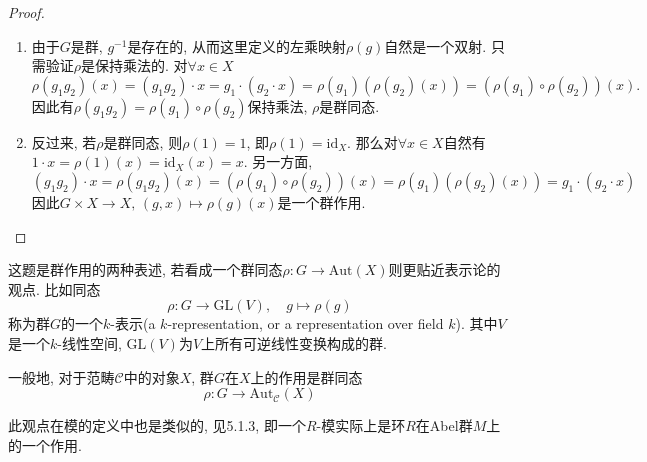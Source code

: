 \documentclass{../solutions-cn}
\begin{document}
\begin{proof}
    \begin{enumerate}[(1)]
        \item 由于$G$是群, $g^{-1}$是存在的, 从而这里定义的左乘映射$\rho(g)$自然是一个双射. 只需验证$\rho$是保持乘法的. 对$\forall x \in X$
        \[
            \rho(g_1g_2)(x) = (g_1g_2) \cdot x = g_1 \cdot (g_2 \cdot x) = \rho(g_1)(\rho(g_2)(x)) = (\rho(g_1) \circ \rho(g_2))(x).
        \]
        因此有$\rho(g_1g_2) = \rho(g_1) \circ \rho(g_2)$保持乘法, $\rho$是群同态.
        \item 反过来, 若$\rho$是群同态, 则$\rho(1) = 1$, 即$\rho(1) = \mathrm{id}_X$. 那么对$\forall x \in X$自然有$1 \cdot x = \rho(1)(x) = \mathrm{id}_X(x) = x$. 另一方面,
        \[
            (g_1g_2) \cdot x = \rho(g_1g_2)(x) = (\rho(g_1) \circ \rho(g_2))(x) = \rho(g_1)(\rho(g_2)(x)) = g_1 \cdot (g_2 \cdot x)
        \]
        因此$G \times X \to X,\, (g, x) \mapsto \rho(g)(x)$是一个群作用.
    \end{enumerate}
\end{proof}

\begin{remark}
    这题是群作用的两种表述, 若看成一个群同态$\rho:G \to \mathrm{Aut}(X)$则更贴近表示论的观点. 比如同态
    \[
        \rho:G \to \mathrm{GL}(V),\quad g \mapsto \rho(g)
    \]
    称为群$G$的一个$k$-表示(a $k$-representation, or a representation over field $k$). 其中$V$是一个$k$-线性空间, $\mathrm{GL}(V)$为$V$上所有可逆线性变换构成的群.
    
    一般地, 对于范畴$\mathcal{C}$中的对象$X$, 群$G$在$X$上的作用是群同态
    \[
        \rho:G \to \mathrm{Aut}_{\mathcal{C}}(X)
    \]

    此观点在模的定义中也是类似的, 见5.1.3, 即一个$R$-模实际上是环$R$在Abel群$M$上的一个作用.
\end{remark}
\end{document}
